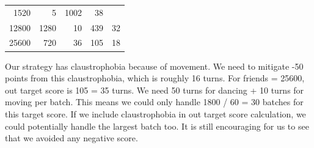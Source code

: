 \begin{longtable}[c]{@{}rrrrr@{}}
\begin{minipage}[t]{0.16\columnwidth}
1520
\strut\end{minipage} &
\begin{minipage}[t]{0.17\columnwidth}\raggedleft\strut
5
\strut\end{minipage} &
\begin{minipage}[t]{0.18\columnwidth}\raggedleft\strut
1002
\strut\end{minipage} &
\begin{minipage}[t]{0.23\columnwidth}\raggedleft\strut
38
\strut\end{minipage}\tabularnewline
\begin{minipage}[t]{0.12\columnwidth}\raggedleft\strut
12800
\strut\end{minipage} &
\begin{minipage}[t]{0.16\columnwidth}\raggedleft\strut
1280
\strut\end{minipage} &
\begin{minipage}[t]{0.17\columnwidth}\raggedleft\strut
10
\strut\end{minipage} &
\begin{minipage}[t]{0.18\columnwidth}\raggedleft\strut
439
\strut\end{minipage} &
\begin{minipage}[t]{0.23\columnwidth}\raggedleft\strut
32
\strut\end{minipage}\tabularnewline
\begin{minipage}[t]{0.12\columnwidth}\raggedleft\strut
25600
\strut\end{minipage} &
\begin{minipage}[t]{0.16\columnwidth}\raggedleft\strut
720
\strut\end{minipage} &
\begin{minipage}[t]{0.17\columnwidth}\raggedleft\strut
36
\strut\end{minipage} &
\begin{minipage}[t]{0.18\columnwidth}\raggedleft\strut
105
\strut\end{minipage} &
\begin{minipage}[t]{0.23\columnwidth}\raggedleft\strut
18
\strut\end{minipage}\tabularnewline
\bottomrule
\end{longtable}

Our strategy has claustrophobia because of movement. We need to mitigate
-50 points from this claustrophobia, which is roughly 16 turns. For
friends = 25600, out target score is 105 = 35 turns. We need 50 turns
for dancing + 10 turns for moving per batch. This means we could only
handle 1800 / 60 = 30 batches for this target score. If we include
claustrophobia in out target score calculation, we could potentially
handle the largest batch too. It is still encouraging for us to see that
we avoided any negative score.
